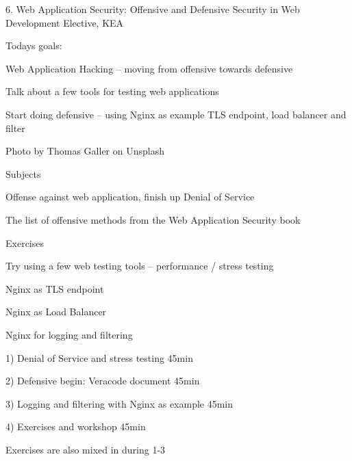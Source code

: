 \documentclass[Screen16to9,17pt]{foils}
\begin{document}
\mytitlepage
{6. Web Application Security: Offensive and Defensive}
{Security in Web Development Elective, KEA}




Todays goals:
\begin{list2}
\item Web Application Hacking -- moving from offensive towards defensive
\item Talk about a few tools for testing web applications
\item Start doing defensive -- using Nginx as example TLS endpoint, load balancer and filter
\end{list2}

Photo by Thomas Galler on Unsplash




\begin{list1}
\item Subjects
\begin{list2}
\item Offense against web application, finish up Denial of Service
\item The list of offensive methods from the Web Application Security book
\end{list2}
\item Exercises
\begin{list2}
\item Try using a few web testing tools -- performance / stress testing
\item Nginx as TLS endpoint
\item Nginx as Load Balancer
\item Nginx for logging and filtering
\end{list2}
\end{list1}


\begin{list2}
\item 1) Denial of Service and stress testing 45min
\item 2) Defensive begin: Veracode document 45min
\item 3) Logging and filtering with Nginx as example 45min
\item 4) Exercises and workshop 45min
\end{list2}

Exercises are also mixed in during 1-3
\end{document}
